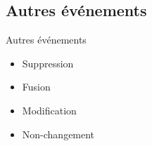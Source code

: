 \documentclass[presentation]{beamer}
\begin{document}
\subsection{Autres événements}

\begin{frame}{Autres événements}
  \begin{itemize}
    \item<1-> Suppression
    \item<2-> Fusion
    \item<3-> Modification
    \item<4-> Non-changement
  \end{itemize}
\end{frame}





\end{document}
